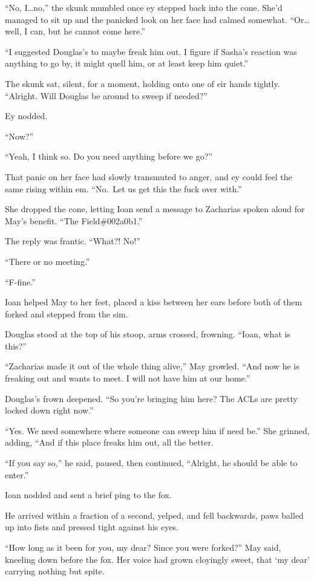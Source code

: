 ``No, I\ldots no,'' the skunk mumbled once ey stepped back into the cone. She'd managed to sit up and the panicked look on her face had calmed somewhat. ``Or\ldots well, I can, but he cannot come here.''

``I suggested Douglas's to maybe freak him out. I figure if Sasha's reaction was anything to go by, it might quell him, or at least keep him quiet.''

The skunk sat, silent, for a moment, holding onto one of eir hands tightly. ``Alright. Will Douglas be around to sweep if needed?''

Ey nodded.

``Now?''

``Yeah, I think so. Do you need anything before we go?''

That panic on her face had slowly transmuted to anger, and ey could feel the same rising within em. ``No.~Let us get this the fuck over with.''

She dropped the cone, letting Ioan send a message to Zacharias spoken aloud for May's benefit. ``The Field\#002a0b1.''

The reply was frantic. ``What?! No!''

``There or no meeting.''

``F-fine.''

Ioan helped May to her feet, placed a kiss between her ears before both of them forked and stepped from the sim.

Douglas stood at the top of his stoop, arms crossed, frowning. ``Ioan, what is this?''

``Zacharias made it out of the whole thing alive,'' May growled. ``And now he is freaking out and wants to meet. I will not have him at our home.''

Douglas's frown deepened. ``So you're bringing him here? The ACLs are pretty locked down right now.''

``Yes. We need somewhere where someone can sweep him if need be.'' She grinned, adding, ``And if this place freaks him out, all the better.

``If you say so,'' he said, paused, then continued, ``Alright, he should be able to enter.''

Ioan nodded and sent a brief ping to the fox.

He arrived within a fraction of a second, yelped, and fell backwards, paws balled up into fists and pressed tight against his eyes.

``How long as it been for you, my dear? Since you were forked?'' May said, kneeling down before the fox. Her voice had grown cloyingly sweet, that `my dear' carrying nothing but spite.

